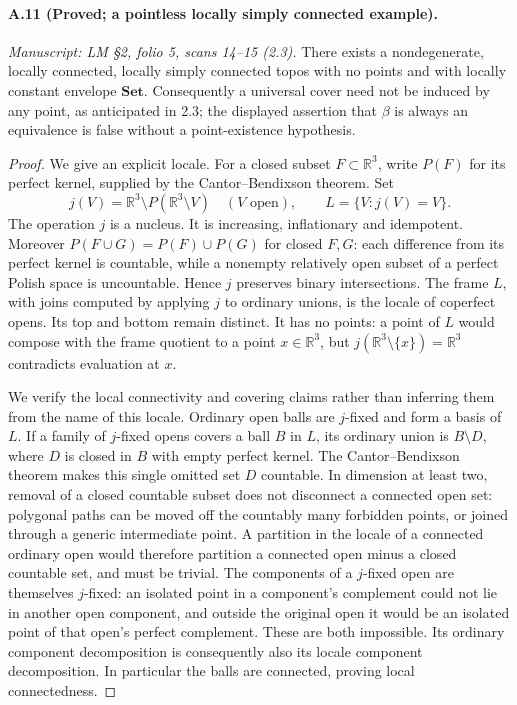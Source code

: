 \paragraph{A.11 (Proved; a pointless locally simply connected example).}
\textit{Manuscript: LM \S2, folio 5, scans 14--15 (2.3).}
There exists a nondegenerate, locally connected, locally simply connected topos with no points and with locally constant envelope $\mathbf{Set}$. Consequently a universal cover need not be induced by any point, as anticipated in 2.3; the displayed assertion that $\beta$ is always an equivalence is false without a point-existence hypothesis.
\begin{proof}
We give an explicit locale. For a closed subset $F\subset\mathbb R^3$, write $P(F)$ for its perfect kernel, supplied by the Cantor--Bendixson theorem. Set
\[
 j(V)=\mathbb R^3\setminus P(\mathbb R^3\setminus V)
 \quad(V\text{ open}),
 \qquad L=\{V:j(V)=V\}.
\]
The operation $j$ is a nucleus. It is increasing, inflationary and idempotent. Moreover $P(F\cup G)=P(F)\cup P(G)$ for closed $F,G$: each difference from its perfect kernel is countable, while a nonempty relatively open subset of a perfect Polish space is uncountable. Hence $j$ preserves binary intersections. The frame $L$, with joins computed by applying $j$ to ordinary unions, is the locale of coperfect opens. Its top and bottom remain distinct. It has no points: a point of $L$ would compose with the frame quotient to a point $x\in\mathbb R^3$, but $j(\mathbb R^3\setminus\{x\})=\mathbb R^3$ contradicts evaluation at $x$.

We verify the local connectivity and covering claims rather than inferring them from the name of this locale. Ordinary open balls are $j$-fixed and form a basis of $L$. If a family of $j$-fixed opens covers a ball $B$ in $L$, its ordinary union is $B\setminus D$, where $D$ is closed in $B$ with empty perfect kernel. The Cantor--Bendixson theorem makes this single omitted set $D$ countable. In dimension at least two, removal of a closed countable subset does not disconnect a connected open set: polygonal paths can be moved off the countably many forbidden points, or joined through a generic intermediate point. A partition in the locale of a connected ordinary open would therefore partition a connected open minus a closed countable set, and must be trivial. The components of a $j$-fixed open are themselves $j$-fixed: an isolated point in a component's complement could not lie in another open component, and outside the original open it would be an isolated point of that open's perfect complement. These are both impossible. Its ordinary component decomposition is consequently also its locale component decomposition. In particular the balls are connected, proving local connectedness.


\end{proof}
